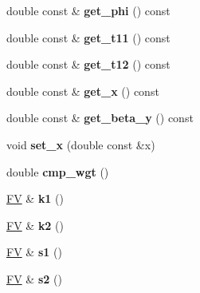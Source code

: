 \begin{DoxyCompactItemize}
\item 
\hypertarget{classPS__2__2_a28bf4d69f8fcb2b359f521289a6a70d1}{double const \& {\bfseries get\-\_\-phi} () const }\label{classPS__2__2_a28bf4d69f8fcb2b359f521289a6a70d1}

\item 
\hypertarget{classPS__2__2_ae717002f8f6d84446f4353aa3cc97757}{double const \& {\bfseries get\-\_\-t11} () const }\label{classPS__2__2_ae717002f8f6d84446f4353aa3cc97757}

\item 
\hypertarget{classPS__2__2_a9e2bc01c150ce569013cebf16ca34528}{double const \& {\bfseries get\-\_\-t12} () const }\label{classPS__2__2_a9e2bc01c150ce569013cebf16ca34528}

\item 
\hypertarget{classPS__2__2_a3b1392c5e6a6e894b87926611333e782}{double const \& {\bfseries get\-\_\-x} () const }\label{classPS__2__2_a3b1392c5e6a6e894b87926611333e782}

\item 
\hypertarget{classPS__2__2_a7c253fa9526fb882c0fb386700f0a084}{double const \& {\bfseries get\-\_\-beta\-\_\-y} () const }\label{classPS__2__2_a7c253fa9526fb882c0fb386700f0a084}

\item 
\hypertarget{classPS__2__2_ab38bb5b8ac36bea7b044a72d0c9cfdbb}{void {\bfseries set\-\_\-x} (double const \&x)}\label{classPS__2__2_ab38bb5b8ac36bea7b044a72d0c9cfdbb}

\item 
\hypertarget{classPS__2__2_ad816da6fba743fbe6d7e67e119ad1cca}{double {\bfseries cmp\-\_\-wgt} ()}\label{classPS__2__2_ad816da6fba743fbe6d7e67e119ad1cca}

\item 
\hypertarget{classPS__2__2_a11a23bbf3ce1288121b6f798012039ea}{\hyperlink{classFV}{F\-V} \& {\bfseries k1} ()}\label{classPS__2__2_a11a23bbf3ce1288121b6f798012039ea}

\item 
\hypertarget{classPS__2__2_ae80de8ff0390f3a92cf8cb55bafcfa39}{\hyperlink{classFV}{F\-V} \& {\bfseries k2} ()}\label{classPS__2__2_ae80de8ff0390f3a92cf8cb55bafcfa39}

\item 
\hypertarget{classPS__2__2_a1776cf6ac281264536b089e88a7507f1}{\hyperlink{classFV}{F\-V} \& {\bfseries s1} ()}\label{classPS__2__2_a1776cf6ac281264536b089e88a7507f1}

\item 
\hypertarget{classPS__2__2_a56b4df2b24c387b2fb18366215ec59c7}{\hyperlink{classFV}{F\-V} \& {\bfseries s2} ()}\label{classPS__2__2_a56b4df2b24c387b2fb18366215ec59c7}


\end{DoxyCompactItemize}
